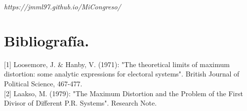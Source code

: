\documentclass[11pt]{article}
\begin{document}
	\vspace{-1em}
	\textit{https://jmml97.github.io/MiCongreso/}
	
	
	\section*{Bibliografía.}


[1] Loosemore, J. \& Hanby, V. (1971): "The theoretical limits of maximum distortion: some analytic expressions for electoral systems". British Journal of Political Science, 467-477.\\

	[2] Laakso, M. (1979): "The Maximum Distortion and the Problem of the First Divisor of Different P.R. Systems". Research Note.\\
	
\end{document}
